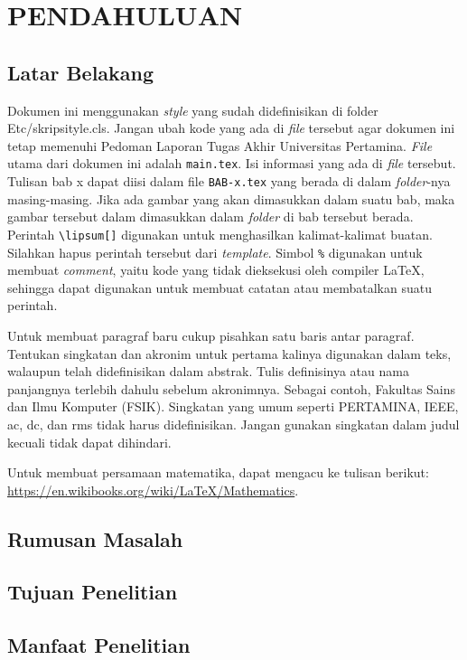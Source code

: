 \chapter{PENDAHULUAN}
\label{BAB1:pendahuluan}

\section{Latar Belakang}
 Dokumen ini menggunakan \textit{style} yang sudah didefinisikan di folder Etc/skripsityle.cls. Jangan ubah kode yang ada di \textit{file} tersebut agar dokumen ini tetap memenuhi Pedoman Laporan Tugas Akhir Universitas Pertamina. \textit{File} utama dari dokumen ini adalah \verb|main.tex|. Isi informasi yang ada di \textit{file} tersebut. Tulisan bab x dapat diisi dalam file \verb|BAB-x.tex| yang berada di dalam \textit{folder}-nya masing-masing. Jika ada gambar yang akan dimasukkan dalam suatu bab, maka gambar tersebut dalam dimasukkan dalam \textit{folder} di bab tersebut berada. Perintah \verb|\lipsum[]| digunakan untuk menghasilkan kalimat-kalimat buatan. Silahkan hapus perintah tersebut dari \textit{template}. Simbol \verb|%| digunakan untuk membuat \textit{comment}, yaitu kode yang tidak dieksekusi oleh compiler \LaTeX, sehingga dapat digunakan untuk membuat catatan atau membatalkan suatu perintah.

 Untuk membuat paragraf baru cukup pisahkan satu baris antar paragraf. Tentukan singkatan dan akronim untuk pertama kalinya digunakan dalam teks, walaupun telah didefinisikan dalam abstrak. Tulis definisinya atau nama panjangnya terlebih dahulu sebelum akronimnya. Sebagai contoh, Fakultas Sains dan Ilmu Komputer (FSIK). Singkatan yang umum seperti PERTAMINA, IEEE, ac, dc, dan rms tidak harus didefinisikan. Jangan gunakan singkatan dalam judul kecuali tidak dapat dihindari.

 Untuk membuat persamaan matematika, dapat mengacu ke tulisan berikut: \url{https://en.wikibooks.org/wiki/LaTeX/Mathematics}. 
  
\section{Rumusan Masalah}
\lipsum[7] %

 
\section{Tujuan Penelitian}
\lipsum[9] %

\section{Manfaat Penelitian}
\lipsum[10] %